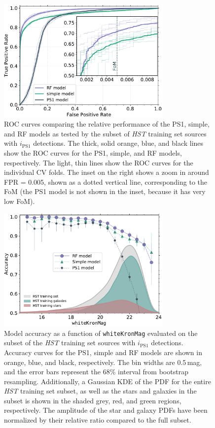 \documentclass[twocolumn, dvipdfmx]{aastex62}
\begin{document}
\begin{figure}[t]
 \centering
  \includegraphics[width=3.35in]{./Figures/CV_ROC_HST.pdf}
  \caption{ ROC curves comparing the relative performance of the PS1,
  simple, and RF models as tested by the subset of \textit{HST} training set
  sources with $i_\mathrm{PS1}$ detections. The thick, solid orange, blue,
  and black lines show the ROC curves for the PS1, simple, and RF models,
  respectively. The light, thin lines show the ROC curves for the individual
  CV folds. The inset on the right shows a zoom in around FPR = 0.005, shown
  as a dotted vertical line, corresponding to the FoM (the PS1 model is not
  shown in the inset, because it has very low FoM). }
  \label{fig:cvroc_hst}
\end{figure}

\begin{figure}[t]
 \centering
  \includegraphics[width=3.35in]{./Figures/CV_Accuracy_HST.pdf}
  \caption{Model accuracy as a function of \texttt{whiteKronMag} evaluated
  on the subset of the \textit{HST} training set sources with
  $i_\mathrm{PS1}$ detections. Accuracy curves for the PS1, simple and RF
  models are shown in orange, blue, and black, respectively. The bin widths
  are 0.5\,mag, and the error bars represent the 68\% interval from
  bootstrap resampling. Additionally, a Gaussian KDE of
  the PDF for the entire \textit{HST} training set subset, as well as the
  stars and galaxies in the subset is shown in the shaded grey, red, and
  green regions, respectively. The amplitude of the star and galaxy PDFs
  have been normalized by their relative ratio compared to the full subset. }
  \label{fig:cvacc_hst}
\end{figure}
\end{document}

